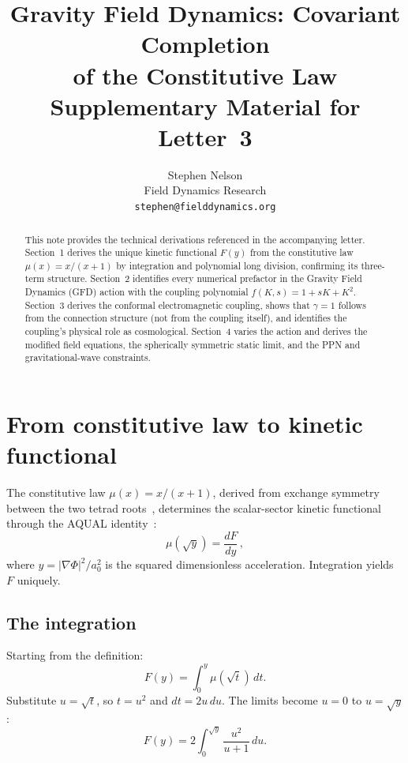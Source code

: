 \documentclass[11pt]{article}
\title{Gravity Field Dynamics: Covariant Completion\\
  of the Constitutive Law\\[6pt]
  {\normalsize Supplementary Material for Letter~3}}
\author{Stephen Nelson\\Field Dynamics Research\\
  \texttt{stephen@fielddynamics.org}}
\date{}
\begin{document}
\maketitle

\begin{abstract}
This note provides the technical derivations referenced
in the accompanying letter.  Section~1
derives the unique kinetic functional $F(y)$ from the
constitutive law $\mu(x) = x/(x{+}1)$ by integration and
polynomial long division, confirming its three-term
structure.  Section~2 identifies every numerical prefactor
in the Gravity Field Dynamics (GFD) action with the
coupling polynomial $f(K,s) = 1 + sK + K^2$.  Section~3
derives the conformal electromagnetic coupling, shows that
$\gamma = 1$ follows from the connection structure (not
from the coupling itself), and identifies the coupling's
physical role as cosmological.  Section~4 varies the action and derives the
modified field equations, the spherically symmetric static
limit, and the PPN and gravitational-wave constraints.
\end{abstract}

\section{From constitutive law to kinetic functional}

The constitutive law $\mu(x) = x/(x{+}1)$, derived from
exchange symmetry between the two tetrad
roots~\cite{Nelson2026b}, determines the scalar-sector
kinetic functional through the AQUAL
identity~\cite{BekensteinMilgrom1984}:
\begin{equation}
  \mu(\sqrt{y}) = \frac{dF}{dy}\,,
  \label{eq:aqual_identity}
\end{equation}
where $y = |\nabla\Phi|^2/a_0^2$ is the squared
dimensionless acceleration.  Integration yields $F$
uniquely.

\subsection*{The integration}

Starting from the definition:
\begin{equation}
  F(y) = \int_0^y \mu(\sqrt{t})\,dt.
  \label{eq:F_integral}
\end{equation}
Substitute $u = \sqrt{t}$, so $t = u^2$ and $dt = 2u\,du$.
The limits become $u = 0$ to $u = \sqrt{y}$:
\begin{equation}
  F(y) = 2\int_0^{\sqrt{y}} \frac{u^2}{u + 1}\,du.
  \label{eq:F_substituted}
\end{equation}
\end{document}
